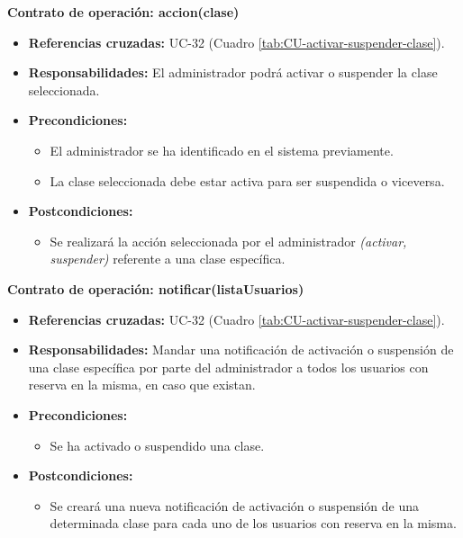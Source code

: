 \textbf{Contrato de operación: accion(clase)}
\begin{itemize}
\item \textbf{Referencias cruzadas:} UC-32 (Cuadro \ref{tab:CU-activar-suspender-clase}).
\item \textbf{Responsabilidades:} El administrador podrá activar o suspender la clase seleccionada.
\item \textbf{Precondiciones:} 
 \begin{itemize}
\item El administrador se ha identificado en el sistema previamente.
\item La clase seleccionada debe estar activa para ser suspendida o viceversa.
\end {itemize}
\item \textbf{Postcondiciones:} 
 \begin{itemize}
\item Se realizará la acción seleccionada por el administrador \textit{(activar, suspender)} referente a una clase específica.
\end {itemize}
\end {itemize}

\textbf{Contrato de operación: notificar(listaUsuarios)}
\begin{itemize}
\item \textbf{Referencias cruzadas:} UC-32 (Cuadro \ref{tab:CU-activar-suspender-clase}).
\item \textbf{Responsabilidades:} Mandar una notificación de activación o suspensión de una clase específica por parte del administrador a todos los usuarios con reserva en la misma, en caso que existan.
\item \textbf{Precondiciones:} 
 \begin{itemize}
\item Se ha activado o suspendido una clase.
\end {itemize}
\item \textbf{Postcondiciones:} 
 \begin{itemize}
\item Se creará una nueva notificación de activación o suspensión de una determinada clase para cada uno de los usuarios con reserva en la misma.
\end {itemize}
\end {itemize}

